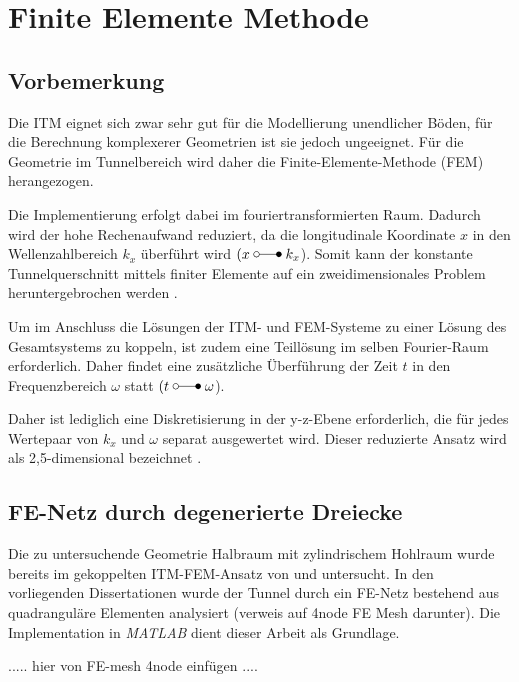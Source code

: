 \chapter{Finite Elemente Methode}
\label{cha:FEM}

\section{Vorbemerkung}
\label{sec:FEM_Vorbemerkung}

Die ITM eignet sich zwar sehr gut für die Modellierung unendlicher Böden, für die Berechnung komplexerer Geometrien ist sie jedoch ungeeignet. Für die Geometrie im Tunnelbereich wird daher die Finite-Elemente-Methode (FEM) herangezogen.

Die Implementierung erfolgt dabei im fouriertransformierten Raum.
Dadurch wird der hohe Rechenaufwand reduziert, da die longitudinale Koordinate $x$ in den Wellenzahlbereich $k_x$ überführt wird \((x \mapto k_x\)). 
Somit kann der konstante Tunnelquerschnitt mittels finiter Elemente auf ein zweidimensionales Problem heruntergebrochen werden \citep{Fruehe2010}. 

Um im Anschluss die Lösungen der ITM- und FEM-Systeme zu einer Lösung des Gesamtsystems zu koppeln, ist zudem eine Teillösung im selben Fourier-Raum erforderlich. 
Daher findet eine zusätzliche Überführung der Zeit $t$ in den Frequenzbereich $\omega$ statt \((t \mapto \omega\)). 

Daher ist lediglich eine Diskretisierung in der y-z-Ebene erforderlich, die für jedes Wertepaar von $k_x$ und $\omega$ separat ausgewertet wird. 
Dieser reduzierte Ansatz wird als 2,5-dimensional bezeichnet \cite{Freisinger_Hackenberg2020}. 


\section{FE-Netz durch degenerierte Dreiecke}
\label{degenerierte Dreiecke}

Die zu untersuchende Geometrie Halbraum mit zylindrischem Hohlraum wurde bereits im gekoppelten ITM-FEM-Ansatz von \cite{Hackenberg2016} und \cite{Freisinger2022} untersucht.
In den vorliegenden Dissertationen wurde der Tunnel durch ein FE-Netz bestehend aus quadranguläre Elementen analysiert (verweis auf 4node FE Mesh darunter).
Die Implementation in \emph{MATLAB\texttrademark} dient dieser Arbeit als Grundlage.

..... hier von FE-mesh 4node einfügen .... 

